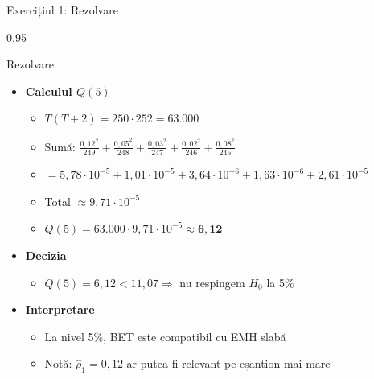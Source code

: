 \documentclass[9pt, aspectratio=169, t]{beamer}
\begin{document}
\begin{frame}[shrink=15]{Exercițiul 1: Rezolvare}
\begin{cminipage}{0.95\textwidth}
\begin{exampleblock}{Rezolvare}
\begin{itemize}\setlength{\itemsep}{0pt}
    \item \textbf{Calculul $Q(5)$}
    \begin{itemize}\setlength{\itemsep}{0pt}
        \item $T(T+2) = 250 \cdot 252 = 63.000$
        \item Sumă: $\frac{0{,}12^2}{249} + \frac{0{,}05^2}{248} + \frac{0{,}03^2}{247} + \frac{0{,}02^2}{246} + \frac{0{,}08^2}{245}$
        \item $= 5{,}78 \cdot 10^{-5} + 1{,}01 \cdot 10^{-5} + 3{,}64 \cdot 10^{-6} + 1{,}63 \cdot 10^{-6} + 2{,}61 \cdot 10^{-5}$
        \item Total $\approx 9{,}71 \cdot 10^{-5}$
        \item $Q(5) = 63.000 \cdot 9{,}71 \cdot 10^{-5} \approx \mathbf{6{,}12}$
    \end{itemize}
    \item \textbf{Decizia}
    \begin{itemize}\setlength{\itemsep}{0pt}
        \item $Q(5) = 6{,}12 < 11{,}07 \Rightarrow$ nu respingem $H_0$ la 5\%
    \end{itemize}
    \item \textbf{Interpretare}
    \begin{itemize}\setlength{\itemsep}{0pt}
        \item La nivel 5\%, BET este compatibil cu EMH slabă
        \item Notă: $\hat\rho_1 = 0{,}12$ ar putea fi relevant pe eșantion mai mare
    \end{itemize}
\end{itemize}
\end{exampleblock}
\end{cminipage}
\end{frame}
\end{document}
